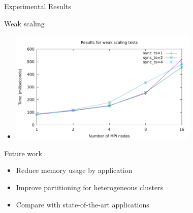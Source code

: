 \documentclass[aspectratio=43,t]{beamer}
\begin{document}
  \begin{frame}{Experimental Results}
    \begin{block}{Weak scaling}
      \begin{itemize}
        \item \includegraphics[width=9cm]{results/weak_scaling.pdf}
      \end{itemize}
    \end{block}
  \end{frame}

  \begin{frame}{Future work}
    \begin{block}{}
      \begin{itemize}
        \item Reduce memory usage by application
        \item Improve partitioning for heterogeneous clusters
        \item Compare with state-of-the-art applications
      \end{itemize}
    \end{block}
  \end{frame}

\end{document}
